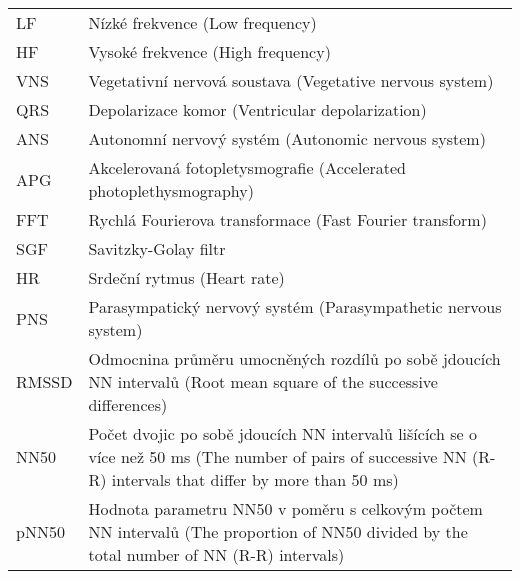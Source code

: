 \begin{table}[h]
\begin{center}
\begin{tabular}{p{2.5cm}p{12.25cm}}
			LF      & Nízké frekvence (Low frequency)                                                                                                                               \\
			HF      & Vysoké frekvence (High frequency)                                                                                                                             \\
			VNS     & Vegetativní nervová soustava (Vegetative nervous system)                                                                                                      \\
			QRS     & Depolarizace komor (Ventricular depolarization)                                                                                                               \\
			ANS     & Autonomní nervový systém (Autonomic nervous system)                                                                                                           \\
			APG     & Akcelerovaná fotopletysmografie (Accelerated photoplethysmography)                                                                                            \\
			FFT     & Rychlá Fourierova transformace (Fast Fourier transform)                                                                                                       \\
			SGF     & Savitzky-Golay filtr                                                                                                                                          \\
			HR      & Srdeční rytmus (Heart rate)                                                                                                                                   \\
			PNS     & Parasympatický nervový systém (Parasympathetic nervous system)                                                                                                \\
			RMSSD   & Odmocnina průměru umocněných rozdílů po sobě jdoucích NN intervalů (Root mean square of the successive differences)                                           \\
			NN50    & Počet dvojic po sobě jdoucích NN intervalů lišících se o více než 50 ms (The number of pairs of successive NN (R-R) intervals that differ by more than 50 ms) \\
			pNN50   & Hodnota parametru NN50 v poměru s celkovým počtem NN intervalů (The proportion of NN50 divided by the total number of NN (R-R) intervals)                     \\

\end{tabular}
\end{center}
\end{table}
